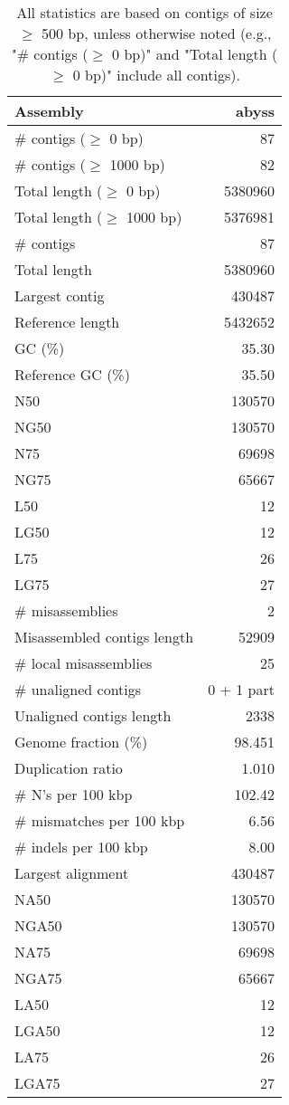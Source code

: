 \documentclass[12pt,a4paper]{article}
\begin{document}
\begin{table}[ht]
\begin{center}
\caption{All statistics are based on contigs of size $\geq$ 500 bp, unless otherwise noted (e.g., "\# contigs ($\geq$ 0 bp)" and "Total length ($\geq$ 0 bp)" include all contigs).}
\begin{tabular}{|l*{1}{|r}|}
\hline
Assembly & abyss \\ \hline
\# contigs ($\geq$ 0 bp) & 87 \\ \hline
\# contigs ($\geq$ 1000 bp) & 82 \\ \hline
Total length ($\geq$ 0 bp) & 5380960 \\ \hline
Total length ($\geq$ 1000 bp) & 5376981 \\ \hline
\# contigs & 87 \\ \hline
Total length & 5380960 \\ \hline
Largest contig & 430487 \\ \hline
Reference length & 5432652 \\ \hline
GC (\%) & 35.30 \\ \hline
Reference GC (\%) & 35.50 \\ \hline
N50 & 130570 \\ \hline
NG50 & 130570 \\ \hline
N75 & 69698 \\ \hline
NG75 & 65667 \\ \hline
L50 & 12 \\ \hline
LG50 & 12 \\ \hline
L75 & 26 \\ \hline
LG75 & 27 \\ \hline
\# misassemblies & 2 \\ \hline
Misassembled contigs length & 52909 \\ \hline
\# local misassemblies & 25 \\ \hline
\# unaligned contigs & 0 + 1 part \\ \hline
Unaligned contigs length & 2338 \\ \hline
Genome fraction (\%) & 98.451 \\ \hline
Duplication ratio & 1.010 \\ \hline
\# N's per 100 kbp & 102.42 \\ \hline
\# mismatches per 100 kbp & 6.56 \\ \hline
\# indels per 100 kbp & 8.00 \\ \hline
Largest alignment & 430487 \\ \hline
NA50 & 130570 \\ \hline
NGA50 & 130570 \\ \hline
NA75 & 69698 \\ \hline
NGA75 & 65667 \\ \hline
LA50 & 12 \\ \hline
LGA50 & 12 \\ \hline
LA75 & 26 \\ \hline
LGA75 & 27 \\ \hline
\end{tabular}
\end{center}
\end{table}
\end{document}
